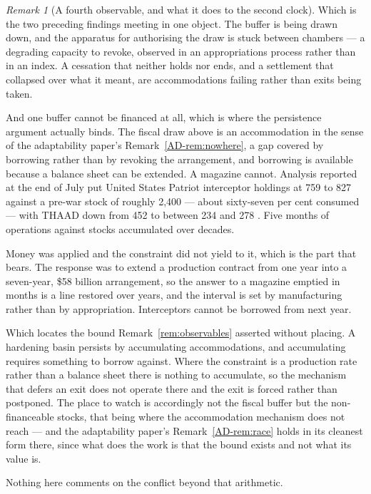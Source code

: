 \documentclass[11pt,a4paper]{article}
\theoremstyle{remark}
\newtheorem{remark}[definition]{Remark}
\begin{document}
\begin{remark}[A fourth observable, and what it does to the second clock]
Which is the two preceding findings meeting in one object. The buffer is being drawn down, and the
apparatus for authorising the draw is stuck between chambers --- a degrading capacity to revoke,
observed in an appropriations process rather than in an index. A cessation that neither holds nor ends,
and a settlement that collapsed over what it meant, are accommodations failing rather than exits being
taken.

And one buffer cannot be financed at all, which is where the persistence argument actually binds.
The fiscal draw above is an accommodation in the sense of the adaptability paper's Remark~\ref{AD-rem:nowhere}, a gap covered by borrowing
rather than by revoking the arrangement, and borrowing is available because a balance sheet can be
extended. A magazine cannot. Analysis reported at the end of July put United States Patriot
interceptor holdings at 759 to 827 against a pre-war stock of roughly 2,400 --- about sixty-seven per
cent consumed --- with THAAD down from 452 to between 234 and 278 \citep{korte2026}. Five months of
operations against stocks accumulated over decades.

Money was applied and the constraint did not yield to it, which is the part that bears. The
response was to extend a production contract from one year into a seven-year, \$58 billion arrangement,
so the answer to a magazine emptied in months is a line restored over years, and the interval is
set by manufacturing rather than by appropriation. Interceptors cannot be borrowed from next year.

Which locates the bound Remark~\ref{rem:observables} asserted without placing. A hardening basin
persists by accumulating accommodations, and accumulating requires something to borrow against.
Where the constraint is a production rate rather than a balance sheet there is nothing to
accumulate, so the mechanism that defers an exit does not operate there and the exit is forced rather
than postponed. The place to watch is accordingly not the fiscal buffer but the non-financeable
stocks, that being where the accommodation mechanism does not reach --- and the adaptability paper's Remark~\ref{AD-rem:race} holds
in its cleanest form there, since what does the work is that the bound exists and not what its value is.

Nothing here comments on the conflict beyond that arithmetic.
\end{remark}
\end{document}
